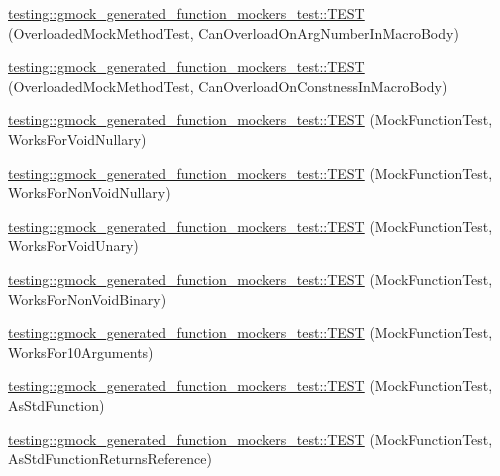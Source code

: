 \begin{DoxyCompactItemize}
\mbox{\hyperlink{namespacetesting_1_1gmock__generated__function__mockers__test_a6542d3ae3f153907c32f3cf15a2ff6cf}{testing\+::gmock\+\_\+generated\+\_\+function\+\_\+mockers\+\_\+test\+::\+T\+E\+ST}} (Overloaded\+Mock\+Method\+Test, Can\+Overload\+On\+Arg\+Number\+In\+Macro\+Body)
\item 
\mbox{\hyperlink{namespacetesting_1_1gmock__generated__function__mockers__test_aa58ec93a77bee21244c10da2bc8cf70e}{testing\+::gmock\+\_\+generated\+\_\+function\+\_\+mockers\+\_\+test\+::\+T\+E\+ST}} (Overloaded\+Mock\+Method\+Test, Can\+Overload\+On\+Constness\+In\+Macro\+Body)
\item 
\mbox{\hyperlink{namespacetesting_1_1gmock__generated__function__mockers__test_a8d67aadbc04fee7e2afc10ee91a76b74}{testing\+::gmock\+\_\+generated\+\_\+function\+\_\+mockers\+\_\+test\+::\+T\+E\+ST}} (Mock\+Function\+Test, Works\+For\+Void\+Nullary)
\item 
\mbox{\hyperlink{namespacetesting_1_1gmock__generated__function__mockers__test_a90817999d7f25ecf280453efb157db84}{testing\+::gmock\+\_\+generated\+\_\+function\+\_\+mockers\+\_\+test\+::\+T\+E\+ST}} (Mock\+Function\+Test, Works\+For\+Non\+Void\+Nullary)
\item 
\mbox{\hyperlink{namespacetesting_1_1gmock__generated__function__mockers__test_ab0e1ede6a1f6ef1774e27f5793a33599}{testing\+::gmock\+\_\+generated\+\_\+function\+\_\+mockers\+\_\+test\+::\+T\+E\+ST}} (Mock\+Function\+Test, Works\+For\+Void\+Unary)
\item 
\mbox{\hyperlink{namespacetesting_1_1gmock__generated__function__mockers__test_ab6337da98bc6bc97100ab177386f3b2b}{testing\+::gmock\+\_\+generated\+\_\+function\+\_\+mockers\+\_\+test\+::\+T\+E\+ST}} (Mock\+Function\+Test, Works\+For\+Non\+Void\+Binary)
\item 
\mbox{\hyperlink{namespacetesting_1_1gmock__generated__function__mockers__test_aa92f0b2b98d76f2c881103a19bed7ba6}{testing\+::gmock\+\_\+generated\+\_\+function\+\_\+mockers\+\_\+test\+::\+T\+E\+ST}} (Mock\+Function\+Test, Works\+For10\+Arguments)
\item 
\mbox{\hyperlink{namespacetesting_1_1gmock__generated__function__mockers__test_a4dc4e74817748ff20dc5367eb83caee3}{testing\+::gmock\+\_\+generated\+\_\+function\+\_\+mockers\+\_\+test\+::\+T\+E\+ST}} (Mock\+Function\+Test, As\+Std\+Function)
\item 
\mbox{\hyperlink{namespacetesting_1_1gmock__generated__function__mockers__test_a02a409f824b52ad582af0291e8ae5ca1}{testing\+::gmock\+\_\+generated\+\_\+function\+\_\+mockers\+\_\+test\+::\+T\+E\+ST}} (Mock\+Function\+Test, As\+Std\+Function\+Returns\+Reference)

\end{DoxyCompactItemize}
